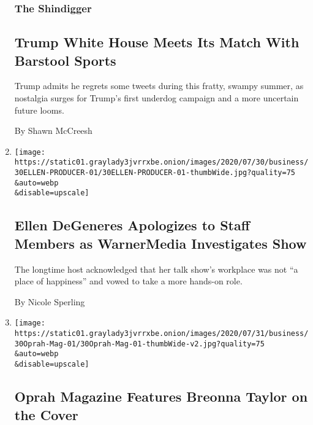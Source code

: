 \begin{enumerate}
  \hypertarget{the-shindigger}{%
  \subsubsection{The Shindigger}\label{the-shindigger}}

  \hypertarget{trump-white-house-meets-its-match-with-barstool-sports}{%
  \subsection{Trump White House Meets Its Match With Barstool
  Sports}\label{trump-white-house-meets-its-match-with-barstool-sports}}

  Trump admits he regrets some tweets during this fratty, swampy summer,
  as nostalgia surges for Trump's first underdog campaign and a more
  uncertain future looms.

  By Shawn McCreesh
\item
  \href{/2020/07/30/business/media/ellen-degeneres-apologizes.html}{}

  \texttt{[image: https://static01.graylady3jvrrxbe.onion/images/2020/07/30/business/30ELLEN-PRODUCER-01/30ELLEN-PRODUCER-01-thumbWide.jpg?quality=75\\\&auto=webp\\\&disable=upscale]}

  \hypertarget{ellen-degeneres-apologizes-to-staff-members-as-warnermedia-investigates-show}{%
  \subsection{Ellen DeGeneres Apologizes to Staff Members as WarnerMedia
  Investigates
  Show}\label{ellen-degeneres-apologizes-to-staff-members-as-warnermedia-investigates-show}}

  The longtime host acknowledged that her talk show's workplace was not
  ``a place of happiness'' and vowed to take a more hands-on role.

  By Nicole Sperling
\item
  \href{/2020/07/30/business/media/oprah-magazine-breonna-taylor-cover.html}{}

  \texttt{[image: https://static01.graylady3jvrrxbe.onion/images/2020/07/31/business/30Oprah-Mag-01/30Oprah-Mag-01-thumbWide-v2.jpg?quality=75\\\&auto=webp\\\&disable=upscale]}

  \hypertarget{oprah-magazine-features-breonna-taylor-on-the-cover}{%
  \subsection{Oprah Magazine Features Breonna Taylor on the
  Cover}\label{oprah-magazine-features-breonna-taylor-on-the-cover}}


\end{enumerate}
